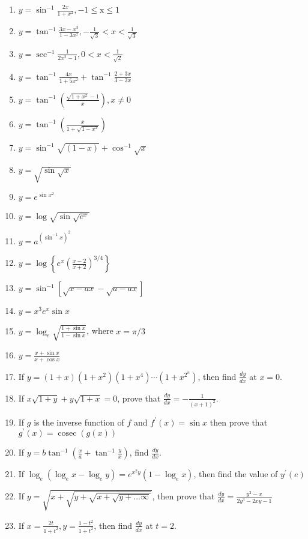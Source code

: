 \begin{enumerate}
    \item $y=\sin ^{-1} \frac{2 x}{1+x^2},-1 \leq \mathrm{x} \leq 1$
    \item $y=\tan ^{-1} \frac{3 x-x^3}{1-3 x^2},-\frac{1}{\sqrt{3}}<x<\frac{1}{\sqrt{3}}$
    \item $y=\sec ^{-1} \frac{1}{2 x^2-1}, 0<x<\frac{1}{\sqrt{2}}$
    \item $y=\tan ^{-1} \frac{4 x}{1+5 x^2}+\tan ^{-1} \frac{2+3 x}{3-2 x}$
    \item $y=\tan ^{-1}\left(\frac{\sqrt{1+x^2}-1}{x}\right), x \neq 0$
    \item $y=\tan ^{-1}\left(\frac{x}{1+\sqrt{1-x^2}}\right)$
    \item $y=\sin ^{-1} \sqrt{(1-x)}+\cos ^{-1} \sqrt{x}$
    \item $y=\sqrt{\sin \sqrt{x}}$
    \item $y=e^{\sin x^2}$
    \item $y=\log \sqrt{\sin \sqrt{e^x}}$
    \item $y=a^{\left(\sin ^{-1} x\right)^2}$
    \item $y=\log \left\{e^x\left(\frac{x-2}{x+2}\right)^{3 / 4}\right\}$
    \item $y=\sin ^{-1}[\sqrt{x-a x}-\sqrt{a-a x}]$
    \item $y=x^3 e^x \sin x$
    \item $y=\log _e \sqrt{\frac{1+\sin x}{1-\sin x}}$, where $x=\pi / 3$
    \item $y=\frac{x+\sin x}{x+\cos x}$
    \item If $y=(1+x)\left(1+x^2\right)\left(1+x^4\right) \cdots\left(1+x^{2^n}\right)$, then find $\frac{d y}{d x}$ at $x=0$.
    \item If $x \sqrt{1+y}+y \sqrt{1+x}=0$, prove that $\frac{d y}{d x}=-\frac{1}{(x+1)^2}$.
    \item If $g$ is the inverse function of $f$ and $f^{\prime}(x)=\sin x$ then prove that $g^{\prime}(x)=\operatorname{cosec}(g(x))$
    \item If $y=b \tan ^{-1}\left(\frac{x}{a}+\tan ^{-1} \frac{y}{x}\right)$, find $\frac{d y}{d x}$.
    \item If $\log _e\left(\log _e x-\log _e y\right)=e^{x^2 y}\left(1-\log _e x\right)$, then find the value of $y^{\prime}(e)$
    \item If $y=\sqrt{x+\sqrt{y+\sqrt{x+\sqrt{y+\ldots \infty}}}}$, then prove that $\frac{d y}{d x}=\frac{y^2-x}{2 y^3-2 x y-1}$
    \item If $x=\frac{2 t}{1+t^2}, y=\frac{1-t^2}{1+t^2}$, then find $\frac{d y}{d x}$ at $t=2$.

\end{enumerate}
